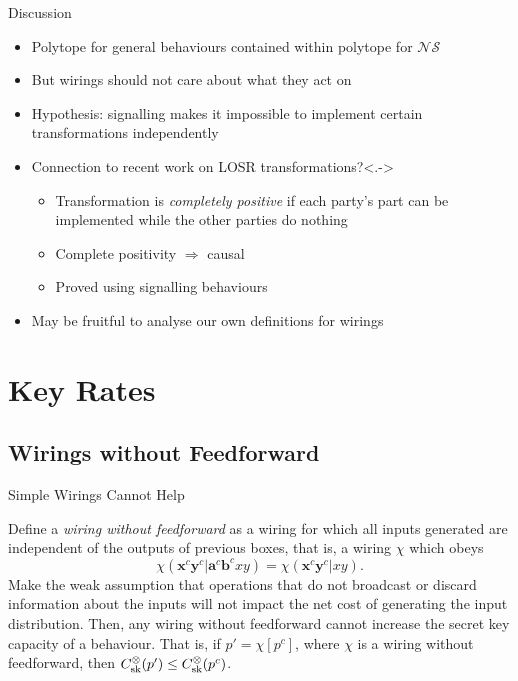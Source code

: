 \documentclass[xcolor=dvipsnames]{beamer}
\newcommand{\?}{\mathrel{?}} %
\newcommand{\cvec}[1]{\boldsymbol{\mathbf{#1}}}    %
\newcommand{\NSs}{\mathcal{NS}}
\newcommand{\sk}{\rm sk}
\begin{document}
\begin{frame}{Discussion}
  \begin{itemize}[<+->]
    \item Polytope for general behaviours contained within polytope for \(\NSs\)
    \item But wirings should not care about what they act on
    \item Hypothesis: signalling makes it impossible to implement certain transformations independently
    \item Connection to recent work on LOSR transformations?\only<.->{}
      \begin{itemize}
        \item Transformation is \emph{completely positive} if each party's part can be implemented while the other parties do nothing
        \item Complete positivity \(\Rightarrow\) causal
        \item Proved using signalling behaviours
      \end{itemize}
    \item May be fruitful to analyse our own definitions for wirings
  \end{itemize}
\end{frame}


\section{Key Rates}

\subsection{Wirings without Feedforward}

\begin{frame}{Simple Wirings Cannot Help}
  \begin{lemma}
                Define a \emph{wiring without feedforward} as a wiring for which all inputs generated are independent of the outputs of previous boxes, that is, a wiring \(\chi\) which obeys
                \[
                  \chi(\cvec{x}^c\cvec{y}^c|\cvec{a}^c\cvec{b}^cxy) = \chi(\cvec{x}^c\cvec{y}^c|xy).
                \]
                Make the weak assumption that operations that do not broadcast or discard information about the inputs will not impact the net cost of generating the input distribution. Then, any wiring without feedforward cannot increase the secret key capacity of a behaviour. That is, if \(p' = \chi[p^{c}]\), where \(\chi\) is a wiring without feedforward, then \(C_{\sk}^{\otimes}(p') \leq C_{\sk}^{\otimes}(p^c)\).
  \end{lemma}
\end{frame}
\end{document}
